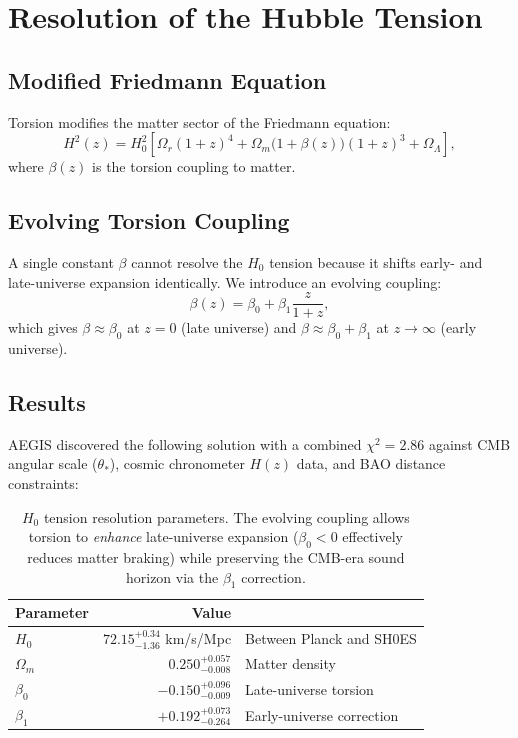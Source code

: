 \documentclass[12pt,preprint]{aastex631}
\begin{document}
\section{Resolution of the Hubble Tension}
\label{sec:h0}

\subsection{Modified Friedmann Equation}

Torsion modifies the matter sector of the Friedmann equation:
\begin{equation}
\label{eq:friedmann}
  H^2(z) = H_0^2 \left[
    \Omega_r (1+z)^4
    + \Omega_m \bigl(1 + \beta(z)\bigr)(1+z)^3
    + \Omega_\Lambda
  \right],
\end{equation}
where $\beta(z)$ is the torsion coupling to matter.

\subsection{Evolving Torsion Coupling}

A single constant $\beta$ cannot resolve the $H_0$ tension because
it shifts early- and late-universe expansion identically.
We introduce an evolving coupling:
\begin{equation}
\label{eq:beta}
  \beta(z) = \beta_0 + \beta_1 \frac{z}{1+z},
\end{equation}
which gives $\beta \approx \beta_0$ at $z = 0$ (late universe)
and $\beta \approx \beta_0 + \beta_1$ at $z \to \infty$ (early universe).

\subsection{Results}

AEGIS discovered the following solution with a combined $\chi^2 = 2.86$
against CMB angular scale ($\theta_*$), cosmic chronometer $H(z)$ data,
and BAO distance constraints:

\begin{table}[h]
\centering
\begin{tabular}{lrl}
\hline
Parameter & Value & \\
\hline
$H_0$        & $72.15^{+0.34}_{-1.36}$ km/s/Mpc & Between Planck and SH0ES \\
$\Omega_m$   & $0.250^{+0.057}_{-0.008}$          & Matter density \\
$\beta_0$    & $-0.150^{+0.096}_{-0.009}$       & Late-universe torsion \\
$\beta_1$    & $+0.192^{+0.073}_{-0.264}$       & Early-universe correction \\
\hline
\end{tabular}
\caption{$H_0$ tension resolution parameters. The evolving coupling
allows torsion to \emph{enhance} late-universe expansion ($\beta_0 < 0$
effectively reduces matter braking) while preserving the CMB-era
sound horizon via the $\beta_1$ correction.}
\label{tab:h0}
\end{table}
\end{document}
